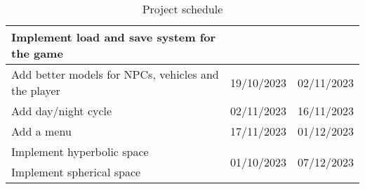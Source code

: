 \begin{table}[H]
\begin{tabular}{lll}
        Implement load and save system for the game         &                              &                              \\ \hline
        Add better models for NPCs, vehicles and the player & 19/10/2023                   & 02/11/2023                   \\ \hline
        Add day/night cycle                                 & 02/11/2023                   & 16/11/2023                   \\ \hline
        Add a menu                                          & 17/11/2023                   & 01/12/2023                   \\ \hline
        Implement hyperbolic space                          & \multirow{3}{*}{01/10/2023}  & \multirow{3}{*}{07/12/2023}  \\
        Implement spherical space                           &                              &                              \\
    \end{tabular}
    \caption{Project schedule}
\end{table}